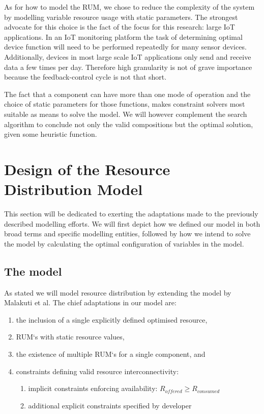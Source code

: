 As for how to model the RUM, we chose to reduce the complexity of the system by modelling variable resource usage with static parameters. The strongest advocate for this choice is the fact of the focus for this research: large IoT applications. In an IoT monitoring platform the task of determining optimal device function will need to be performed repeatedly for many sensor devices. Additionally, devices in most large scale IoT applications  only send and receive data a few times per day\cite{refs over size zoeken}. Therefore high granularity is not of grave importance because the feedback-control cycle is not that short. 

The fact that a component can have more than one mode of operation and the choice of static parameters for those functions, makes constraint solvers most suitable as means to solve the model. We will however complement the search algorithm to conclude not only the valid compositions but the optimal solution, given some heuristic function.

\section{Design of the Resource Distribution Model}
This section will be dedicated to exerting the adaptations made to the previously described modelling efforts. We will first depict how we defined our model in both broad terms and specific modelling entities, followed by how we intend to solve the model by calculating the optimal configuration of variables in the model.
\subsection{The model}
As stated we will model resource distribution by extending the model by Malakuti et al\cite{steven_te_brinke}. The chief adaptations in our model are:
\begin{enumerate}
\nospace
\item the inclusion of a single explicitly defined optimised resource,
\item RUM`s with static resource values,
\item the existence of multiple RUM`s for a single component, and
\item constraints defining valid resource interconnectivity:
\begin{enumerate}
\nospace
\item implicit constraints enforcing availability: $R_{offered} \geq R_{consumed}$
\item additional explicit constraints specified by developer
\end{enumerate}
\end{enumerate}

